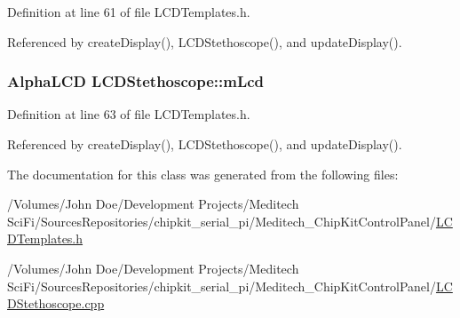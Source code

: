 Definition at line 61 of file L\-C\-D\-Templates.\-h.



Referenced by create\-Display(), L\-C\-D\-Stethoscope(), and update\-Display().

\hypertarget{class_l_c_d_stethoscope_af91304920f29b700ae27aee8aba23ac1}{
\subsubsection[{m\-Lcd}]{\setlength{\rightskip}{0pt plus 5cm}Alpha\-L\-C\-D L\-C\-D\-Stethoscope\-::m\-Lcd\hspace{0.3cm}{\ttfamily [private]}}}\label{class_l_c_d_stethoscope_af91304920f29b700ae27aee8aba23ac1}


Definition at line 63 of file L\-C\-D\-Templates.\-h.



Referenced by create\-Display(), L\-C\-D\-Stethoscope(), and update\-Display().



The documentation for this class was generated from the following files\-:\begin{DoxyCompactItemize}
\item 
/\-Volumes/\-John Doe/\-Development Projects/\-Meditech Sci\-Fi/\-Sources\-Repositories/chipkit\-\_\-serial\-\_\-pi/\-Meditech\-\_\-\-Chip\-Kit\-Control\-Panel/\hyperlink{_l_c_d_templates_8h}{L\-C\-D\-Templates.\-h}\item 
/\-Volumes/\-John Doe/\-Development Projects/\-Meditech Sci\-Fi/\-Sources\-Repositories/chipkit\-\_\-serial\-\_\-pi/\-Meditech\-\_\-\-Chip\-Kit\-Control\-Panel/\hyperlink{_l_c_d_stethoscope_8cpp}{L\-C\-D\-Stethoscope.\-cpp}\end{DoxyCompactItemize}

